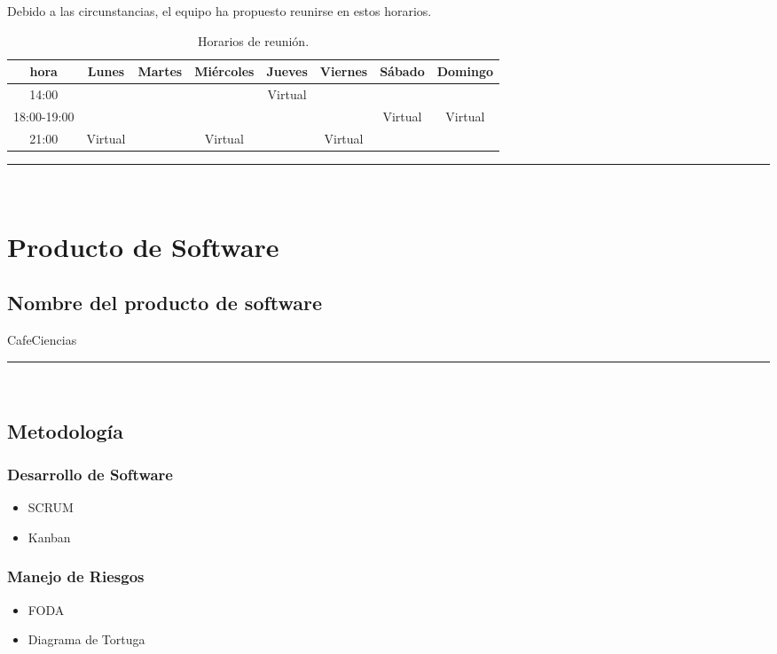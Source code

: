 \documentclass{article}
\begin{document}
Debido a las circunstancias, el equipo ha propuesto reunirse en estos horarios.
\begin{center}
  \begin{table}[H]
    \centering
    \begin{tabular}{| c | c | c | c | c | c | c | c | }
      \hline
      hora & Lunes & Martes & Miércoles & Jueves & Viernes & Sábado & Domingo \\
      \hline
      14:00 & & & & Virtual & & & \\ \hline
      18:00-19:00 & & & & &  & Virtual & Virtual  \\ \hline
      21:00 & Virtual & & Virtual & & Virtual & & \\ \hline
    \end{tabular}
    \caption{Horarios de reunión.}
    \label{tabla:horarios}
  \end{table}
\end{center}

\rule{0.8\textwidth}{.8pt}\\

\newpage
\section*{Producto de Software}

\subsection*{Nombre del producto de software}
CafeCiencias\\

\rule{0.8\textwidth}{.8pt}\\

\subsection*{Metodología}
\subsubsection*{Desarrollo de Software}
\begin{itemize}
\item SCRUM
\item Kanban
\end{itemize}
\subsubsection*{Manejo de Riesgos}
\begin{itemize}
\item FODA
\item Diagrama de Tortuga
\end{itemize}
\end{document}
